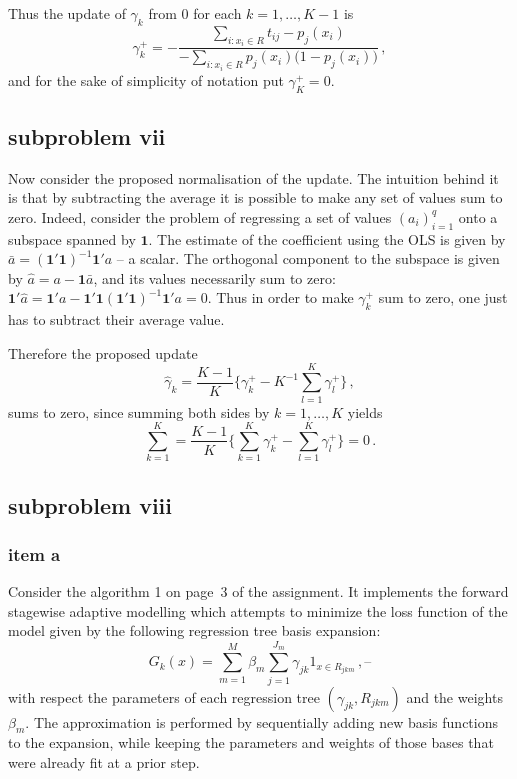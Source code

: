 \documentclass[a4paper]{article}
\newcommand{\one}{\mathbf{1}}
\begin{document}
Thus the update of $\gamma_k$ from $0$ for each $k=1,\ldots, K-1$ is
\[
\gamma_k^+ = - \frac{ \sum_{i:x_i\in R} t_{ij} - p_j(x_i) }{- \sum_{i:x_i\in R} p_j(x_i) \bigl(1 - p_j(x_i)\bigr)}\,,
\]
and for the sake of simplicity of notation put $\gamma_K^+ = 0$.


\subsection{subproblem vii} %
\label{sub:subproblem_vii}

Now consider the proposed normalisation of the update. The intuition behind it is
that by subtracting the average it is possible to make any set of values sum to
zero. Indeed, consider the problem of regressing a set of values $(a_i)_{i=1}^q$
onto a subspace spanned by $\one$. The estimate of the coefficient using the OLS
is given by $\bar{a} = (\one'\one)^{-1} \one'a$ -- a scalar. The orthogonal component
to the subspace is given by $\hat{a} = a - \one \bar{a}$, and its values necessarily
sum to zero: $\one'\hat{a} = \one' a - \one'\one (\one'\one)^{-1} \one'a = 0$.
Thus in order to make $\gamma_k^+$ sum to zero, one just has to subtract their
average value.

Therefore the proposed update
\[
\hat{\gamma}_k = \frac{K-1}{K}\biggl\{ \gamma_k^+ - K^{-1} \sum_{l=1}^K \gamma_l^+ \biggr\} \,,
\]
sums to zero, since summing both sides by $k=1,\ldots, K$ yields
\[
\sum_{k=1}^K = \frac{K-1}{K} \biggl\{ \sum_{k=1}^K \gamma_k^+ - \sum_{l=1}^K \gamma_l^+ \biggr\} = 0\,.
\]


\subsection{subproblem viii} %
\label{sub:subproblem_viii}

\subsubsection{item a} %
\label{ssub:item_a}

Consider the algorithm 1 on page~3 of the assignment. It implements the forward
stagewise adaptive modelling which attempts to minimize the loss function of the
model given by the following regression tree basis expansion:
\[
G_k(x) = \sum_{m=1}^M \beta_m \sum_{j=1}^{J_m} \gamma_{jk} 1_{x\in R_{jkm}}\,, \text{--}
\]
with respect the parameters of each regression tree $(\gamma_{jk}, R_{jkm})$ and
the weights $\beta_m$. The approximation is performed by sequentially adding new
basis functions to the expansion, while keeping the parameters and weights of those
bases that were already fit at a prior step.
\end{document}
